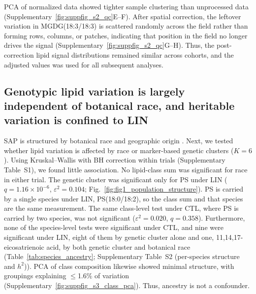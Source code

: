 \documentclass[9pt,twocolumn,twoside]{rilabRxiv}
\begin{document}
PCA of normalized data showed tighter sample clustering than unprocessed data (Supplementary~\ref{fig:suppfig_s2_qc}E--F). After spatial correction, the leftover variation in MGDG(18:3/18:3) is scattered randomly across the field rather than forming rows, columns, or patches, indicating that position in the field no longer drives the signal (Supplementary~\ref{fig:suppfig_s2_qc}G--H). Thus, the post-correction lipid signal distributions remained similar across cohorts, and the adjusted values was used for all subsequent analyses.

\subsection*{Genotypic lipid variation is largely independent of botanical race, and heritable variation is confined to LIN}

SAP is structured by botanical race and geographic origin \citep{Casa2008CommunityResourcesSorghum, Boatwright2022}. Next, we tested whether lipid variation is affected by race or marker-based genetic clusters ($K=6$). Using Kruskal–Wallis with BH correction within trials (Supplementary Table~S1), we found little association. No lipid-class sum was significant for race in either trial. The genetic cluster was significant only for PS under LIN ($q=1.16\times10^{-6}$, $\varepsilon^2=0.104$; Fig.~\ref{fig:fig1_population_structure}). PS is carried by a single species under LIN, PS(18:0/18:2), so the class sum and that species are the same measurement. The same class-level test under CTL, where PS is carried by two species, was not significant ($\varepsilon^2=0.020$, $q=0.358$). Furthermore, none of the species-level tests were significant under CTL, and nine were significant under LIN, eight of them by genetic cluster alone and one, 11,14,17-eicosatrienoic acid, by both genetic cluster and botanical race (Table~\ref{tab:species_ancestry}; Supplementary Table~S2 (per-species structure and $h^2$)). PCA of class composition likewise showed minimal structure, with groupings explaining $\le$1.6\% of variation (Supplementary~\ref{fig:suppfig_s3_class_pca}). Thus, ancestry is not a confounder.
\end{document}
